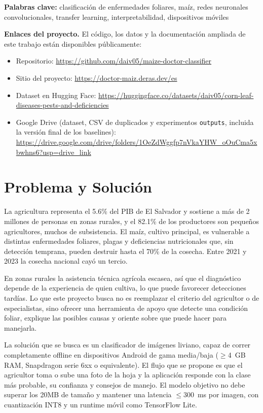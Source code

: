 \documentclass[12pt,letterpaper]{article}
\begin{document}
\noindent\textbf{Palabras clave:} clasificaci\'on de enfermedades foliares, ma\'iz, redes neuronales convolucionales, transfer learning, interpretabilidad, dispositivos m\'oviles

\bigskip
\noindent\textbf{Enlaces del proyecto.} El c\'odigo, los datos y la documentaci\'on ampliada de este trabajo est\'an disponibles p\'ublicamente:

\begin{itemize}
\item Repositorio: \url{https://github.com/daiv05/maize-doctor-classifier}
\item Sitio del proyecto: \url{https://doctor-maiz.deras.dev/es}
\item Dataset en Hugging Face: \url{https://huggingface.co/datasets/daiv05/corn-leaf-diseases-pests-and-deficiencies}
\item Google Drive (dataset, CSV de duplicados y experimentos \texttt{outputs}, incluida la versi\'on final de los baselines): \url{https://drive.google.com/drive/folders/1OeZdWggfp7nVkaYHW_oOuCma5xbwhns6?usp=drive_link}
\end{itemize}

\newpage

\section{Problema y Soluci\'on}

La agricultura representa el 5.6\% del PIB de El Salvador y sostiene a m\'as de 2 millones de personas en zonas rurales, y el 82.1\% de los productores son peque\~nos agricultores, muchos de subsistencia. El ma\'iz, cultivo principal, es vulnerable a distintas enfermedades foliares, plagas y deficiencias nutricionales que, sin detecci\'on temprana, pueden destruir hasta el 70\% de la cosecha. Entre 2021 y 2023 la cosecha nacional cay\'o un tercio.

En zonas rurales la asistencia t\'ecnica agr\'icola escasea, as\'i que el diagn\'ostico depende de la experiencia de quien cultiva, lo que puede favorecer detecciones tard\'ias. Lo que este proyecto busca no es reemplazar el criterio del agricultor o de especialistas, sino ofrecer una herramienta de apoyo que detecte una condici\'on foliar, explique las posibles causas y oriente sobre que puede hacer para manejarla.

La soluci\'on que se busca es un clasificador de im\'agenes liviano, capaz de correr completamente offline en dispositivos Android de gama media/baja (${\geq}$4~GB RAM, Snapdragon serie 6xx o equivalente). El flujo que se propone es que el agricultor toma o sube una foto de la hoja y la aplicaci\'on responde con la clase m\'as probable, su confianza y consejos de manejo. El modelo objetivo no debe superar los 20MB de tamaño y mantener una latencia ${\leq}300$~ms por imagen, con cuantizaci\'on INT8 y un runtime m\'ovil como TensorFlow Lite.
\end{document}
